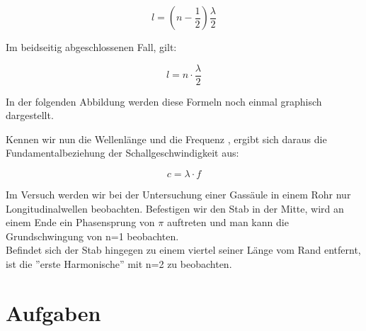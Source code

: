 \documentclass{article}
\begin{document}
{\begin{equation}
\label{l1}
l=\left(n-\frac{1}{2}\right)\frac{\lambda}{2}
\end{equation}

Im beidseitig abgeschlossenen Fall, gilt:

\begin{equation}
l=n\cdot\frac{\lambda}{2}
\end{equation}

In der folgenden Abbildung werden diese Formeln noch einmal graphisch dargestellt.
{\begin{center}
\begin{minipage}{\linewidth}
\centering
{}
\label{welle}
\end{minipage}
\end{center}

Kennen wir nun die Wellenlänge und die Frequenz , ergibt sich daraus die Fundamentalbeziehung der Schallgeschwindigkeit aus:

\begin{equation}
c=\lambda\cdot f
\end{equation}

Im Versuch werden wir bei der Untersuchung einer Gassäule in einem Rohr nur Longitudinalwellen beobachten. Befestigen wir den Stab in der Mitte, wird an einem Ende ein Phasensprung von \(\pi\) auftreten und man kann die Grundschwingung von n=1 beobachten.\\
Befindet sich der Stab hingegen zu einem viertel seiner Länge vom Rand entfernt, ist die ''erste Harmonische'' mit n=2 zu beobachten.\\


\newpage
\section{Aufgaben}
}}
\end{document}
